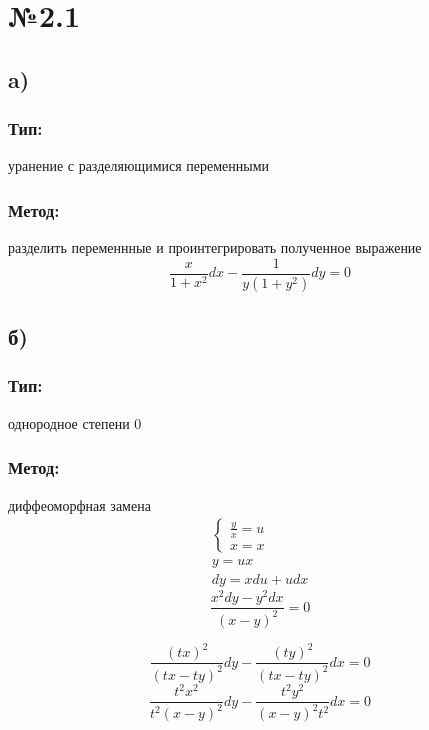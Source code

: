 \documentclass{article}
\begin{document}
\section*{№2.1}
\subsection*{a)}
\subsubsection*{Тип:} 
уранение с разделяющимися переменными

\subsubsection*{Метод:}
разделить переменнные и проинтегрировать полученное выражение
\begin{equation*}
\frac{x}{1 + x^2}dx - \frac{1}{y(1+y^2)}dy = 0
\end{equation*}

\subsection*{б)}
\subsubsection*{Тип:} 
однородное степени 0

\subsubsection*{Метод:}
диффеоморфная замена
\begin{gather*}
\begin{cases}
\frac{y}{x}=u \\
x=x
\end{cases}\\
y=ux \\
dy=xdu+udx  
\end{gather*}
\begin{equation*}
\frac{x^2dy - y^2dx}{(x - y)^2} = 0
\end{equation*}


\begin{equation*}
\frac{(tx)^2}{(tx - ty)^2}dy - \frac{(ty)^2}{(tx - ty)^2}dx = 0
\end{equation*}
\begin{equation*}
\frac{t^2x^2}{t^2(x - y)^2}dy - \frac{t^2y^2}{(x - y)^2t^2}dx = 0
\end{equation*}
\end{document}
